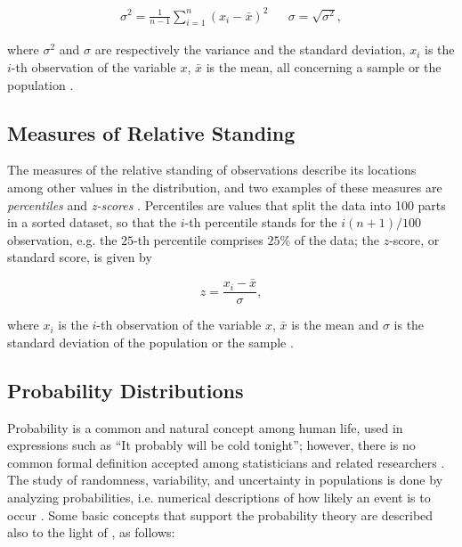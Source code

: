 \begin{align}
\label{eqn:variance_std}
\sigma^{2} = \frac{1}{n - 1} \sum_{i = 1}^{n} \left(x_{i} - \bar{x}\right)^{2}
&&
\sigma = \sqrt{\sigma^{2}},
\end{align}

\noindent where $\sigma^{2}$ and $\sigma$ are respectively the variance and the standard deviation, $x_{i}$ is the $i$-th observation of the variable $x$, $\bar{x}$ is the mean, all concerning a sample or the population \cite{zwillinger1999crc}.

\subsection{Measures of Relative Standing}

The measures of the relative standing of observations describe its locations among other values in the distribution, and two examples of these measures are \emph{percentiles} and \emph{z-scores} \cite{mendenhall2016statistics}. Percentiles are values that split the data into 100 parts in a sorted dataset, so that the $i$-th percentile stands for the $i(n + 1) / 100$ observation, e.g. the $25$-th percentile comprises $25\%$ of the data; the $z$-score, or standard score, is given by

\begin{equation}
\label{eqn:z_score}
z = \frac{x_{i} - \bar{x}}{\sigma},
\end{equation}

\noindent where $x_{i}$ is the $i$-th observation of the variable $x$, $\bar{x}$ is the mean and $\sigma$ is the standard deviation of the population or the sample \cite{zwillinger1999crc}.

\subsection{Probability Distributions}

Probability is a common and natural concept among human life, used in expressions such as ``It probably will be cold tonight''; however, there is no common formal definition accepted among statisticians and related researchers \cite{degroot2012probability}. The study of randomness, variability, and uncertainty in populations is done by analyzing probabilities, i.e. numerical descriptions of how likely an event is to occur \cite{devore2011probability}. Some basic concepts that support the probability theory are described also to the light of , as follows:

